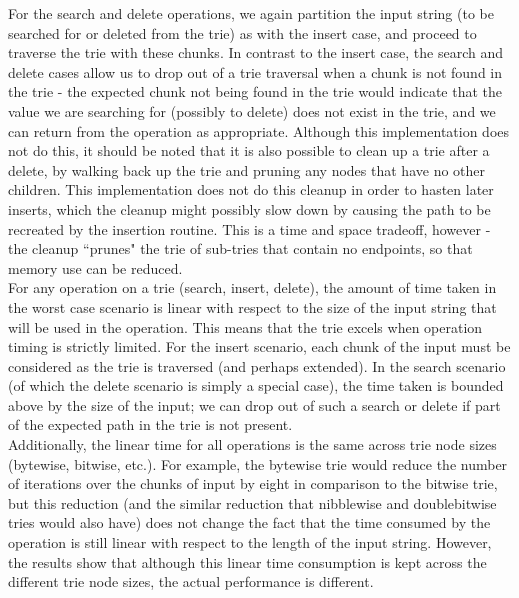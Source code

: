 \documentclass{llncs}
\begin{document}
For the search and delete operations, we again partition the input string (to be searched for or deleted from the trie) as with the insert case, and proceed to traverse the trie with these chunks. In contrast to the insert case, the search and delete cases allow us to drop out of a trie traversal when a chunk is not found in the trie - the expected chunk not being found in the trie would indicate that the value we are searching for (possibly to delete) does not exist in the trie, and we can return from the operation as appropriate. Although this implementation does not do this, it should be noted that it is also possible to clean up a trie after a delete, by walking back up the trie and pruning any nodes that have no other children. This implementation does not do this cleanup in order to hasten later inserts, which the cleanup might possibly slow down by causing the path to be recreated by the insertion routine. This is a time and space tradeoff, however - the cleanup ``prunes" the trie of sub-tries that contain no endpoints, so that memory use can be reduced.\\

For any operation on a trie (search, insert, delete), the amount of time taken in the worst case scenario is linear with respect to the size of the input string that will be used in the operation. This means that the trie excels when operation timing is strictly limited. For the insert scenario, each chunk of the input must be considered as the trie is traversed (and perhaps extended). In the search scenario (of which the delete scenario is simply a special case), the time taken is bounded above by the size of the input; we can drop out of such a search or delete if part of the expected path in the trie is not present. \\

Additionally, the linear time for all operations is the same across trie node sizes (bytewise, bitwise, etc.). For example, the bytewise trie would reduce the number of iterations over the chunks of input by eight in comparison to the bitwise trie, but this reduction (and the similar reduction that nibblewise and doublebitwise tries would also have) does not change the fact that the time consumed by the operation is still linear with respect to the length of the input string. However, the results show that although this linear time consumption is kept across the different trie node sizes, the actual performance is different.\\
\newpage
\end{document}

